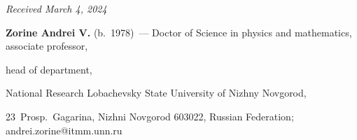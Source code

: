 \vspace*{-6pt}



\hfill{\small\textit{Received March 4, 2024}} 



\vspace*{-18pt}



\Contrl



\vspace*{-3pt}



\noindent 

\textbf{Zorine Andrei V.} (b.\ 1978)~--- Doctor of Science in physics and mathematics, associate professor, 

head of department,

National Research Lobachevsky State University of Nizhny Novgorod, 

23~Prosp.\ Gagarina, Nizhni Novgorod 603022, Russian Federation; \mbox{andrei.zorine@itmm.unn.ru}





\label{end\stat}



\renewcommand{\bibname}{\protect\rm Литература} 

